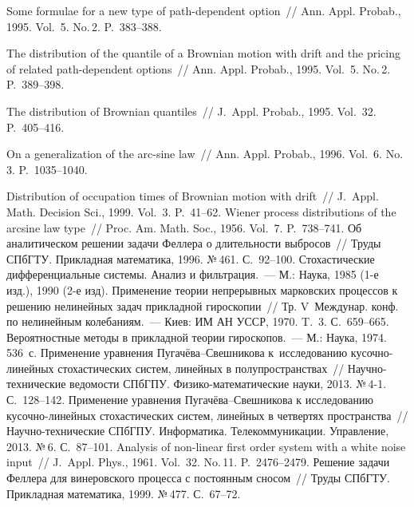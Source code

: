 \begin{multicols}{2}
{{\begin{thebibliography}{99}
 Some formulae for a new type of path-dependent option~//
Ann. Appl. Probab., 1995. Vol.~5. No.\,2. P.~383--388.

 The distribution of the quantile of a Brownian motion with drift and the pricing of related path-dependent options~// Ann. Appl. Probab., 1995. Vol.~5. No.\,2. P.~389--398.

 The distribution of Brownian quantiles~// J.~Appl. Probab., 1995. Vol.~32. P.~405--416.

 On a generalization of the arc-sine law~// Ann. Appl. Probab., 1996. Vol.~6. No.\,3. P.~1035--1040.



 Distribution of occupation times of Brownian motion with drift~// J.~Appl. Math. Decision Sci., 1999. Vol.~3. P.~41--62.
 Wiener process distributions of the arcsine law type~//
Proc. Am. Math. Soc., 1956. Vol.~7. P.~738--741.
 Об аналитическом решении задачи Феллера о длительности выбросов~// Труды СПбГТУ. Прикладная математика, 1996. №\,461. С.~92--100.
 Стохастические дифференциальные системы. Анализ и фильтрация.~--- М.: Наука, 1985 (1-е изд.), 1990 (2-е изд).
 Применение теории непрерывных марковских процессов к решению нелинейных задач прикладной гироскопии~// Тр. V~Междунар. конф. по нелинейным колебаниям.~--- Киев: ИМ АН УССР, 1970. T.~3. С.~659--665.
 Вероятностные методы в прикладной теории гироскопов.~--- М.: Наука, 1974. 536~с.
 Применение уравнения Пу\-га\-чё\-ва--Свеш\-ни\-ко\-ва к~исследованию ку\-соч\-но-ли\-ней\-ных стохастических систем, линейных в полупространствах~// На\-уч\-но-тех\-ни\-че\-ские ведомости СПбГПУ. Физико-математические науки, 2013. №\,4-1. С.~128--142.
 Применение уравнения Пу\-га\-чё\-ва--Свешникова к исследованию ку\-соч\-но-ли\-ней\-ных стохастических систем, линейных в четвертях пространства~// На\-уч\-но-тех\-ни\-че\-ские СПбГПУ. Информатика. Телекоммуникации. Управление, 2013. №\,6. С.~87--101.
 Analysis of non-linear first order system with a white noise input~// J.~Appl. Phys., 1961. Vol.~32. No.\,11. P.~2476--2479.
 Решение задачи Феллера для винеровского процесса с постоянным сносом~// Труды СПбГТУ. Прикладная математика, 1999. №\,477. С.~67--72.

\end{thebibliography}}}
\end{multicols}
